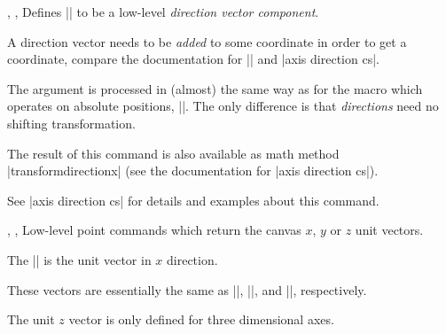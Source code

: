 \begin{commandlist}{%
    \pgfplotstransformdirectionx{},
    \pgfplotstransformdirectiony{},
    \pgfplotstransformdirectionz{}%
}
    Defines |\pgfmathresult| to be a low-level \PGF{} \emph{direction vector
    component}.

    A direction vector needs to be \emph{added} to some coordinate in order to
    get a coordinate, compare the documentation for
    |\pgfplotspointaxisdirectionxy| and |axis direction cs|.

    The argument  is processed in (almost) the
    same way as for the macro which operates on absolute positions,
    |\pgfplotstransformcoordinatex|. The only difference is that
    \emph{directions} need no shifting transformation.

    The result of this command is also available as math method
    |transformdirectionx| (see the documentation for |axis direction cs|).

    See |axis direction cs| for details and examples about this command.
\end{commandlist}

%
%

\begin{commandlist}{%
    \pgfplotspointunitx,
    \pgfplotspointunity,
    \pgfplotspointunitz%
}
    Low-level point commands which return the canvas $x$, $y$ or $z$ unit
    vectors.

    The |\pgfplotspointunitx| is the \pgfname{} unit vector in $x$ direction.

    These vectors are essentially the same as ||,
    ||, and ||, respectively.

    The unit $z$ vector is only defined for three dimensional axes.
\end{commandlist}

